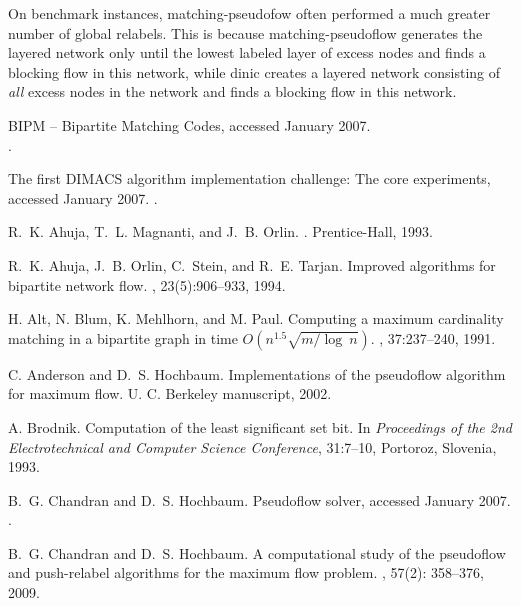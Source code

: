 \documentclass{article}
\begin{document}
\begin{itemize}
On benchmark instances, {\sf matching-pseudofow} often performed a much greater number of global relabels.  This is because {\sf matching-pseudoflow} generates the layered network only until the lowest labeled layer of excess nodes and finds a blocking flow in this network, while {\sf dinic} creates a layered network consisting of {\em all} excess nodes in the network and finds a blocking flow in this network.
\end{itemize}

\begin{thebibliography}{99}

BIPM -- Bipartite Matching Codes, accessed January 2007. \\
.

The first {DIMACS} algorithm implementation challenge: {T}he core experiments, accessed January 2007.
.

R.~K. Ahuja, T.~L. Magnanti, and J.~B. Orlin.
.
\newblock Prentice-Hall, 1993.

R.~K. Ahuja, J.~B. Orlin, C.~Stein, and R.~E. Tarjan.
\newblock Improved algorithms for bipartite network flow.
, 23(5):906--933, 1994.

H. Alt, N. Blum, K. Mehlhorn, and M. Paul.
\newblock Computing a maximum cardinality matching in a bipartite graph in time \mbox{$O(n^{1.5}\sqrt{m/\log~n})$.}
, 37:237--240, 1991.

C. Anderson and D.~S. Hochbaum.
\newblock Implementations of the pseudoflow algorithm for maximum flow.
\newblock U. C. Berkeley manuscript, 2002.

A. Brodnik.
\newblock Computation of the least significant set bit.
\newblock In {\em Proceedings of the 2nd Electrotechnical and Computer Science Conference}, 31:7--10, Portoroz, Slovenia, 1993.
 
B.~G. Chandran and D.~S. Hochbaum.
\newblock Pseudoflow solver, accessed January 2007.
.
 
B.~G. Chandran and D.~S. Hochbaum.
\newblock A computational study of the pseudoflow and push-relabel algorithms for the maximum flow problem.
, 57(2): 358--376, 2009.


\end{thebibliography}
\end{document}
